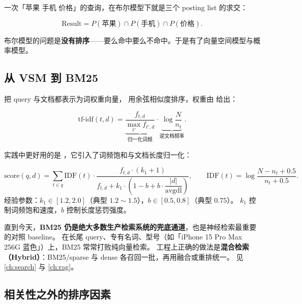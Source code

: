 一次「苹果 手机 价格」的查询，在布尔模型下就是三个 posting list 的求交：

\begin{equation}
\text{Result} = P(\text{苹果}) \cap P(\text{手机}) \cap P(\text{价格}).
\end{equation}

布尔模型的问题是\textbf{没有排序}——要么命中要么不命中。于是有了向量空间模型与概率模型。

\subsection{从 VSM 到 BM25}

 把 query 与文档都表示为词权重向量，
用余弦相似度排序，权重由  给出：

\begin{equation}
\text{tf-idf}(t, d) = \underbrace{\frac{f_{t,d}}{\max_{t'} f_{t',d}}}_{\text{归一化词频}} \cdot
\underbrace{\log \frac{N}{n_t}}_{\text{逆文档频率}} .
\end{equation}

实践中更好用的是 ，它引入了词频饱和与文档长度归一化：

\begin{formulacard}[BM25（Okapi）]
\begin{equation}
\text{score}(q, d) = \sum_{t \in q} \text{IDF}(t) \cdot
\frac{f_{t,d} \cdot (k_1 + 1)}{f_{t,d} + k_1 \cdot \left(1 - b + b \cdot \dfrac{|d|}{\text{avgdl}}\right)} ,
\qquad
\text{IDF}(t) = \log \frac{N - n_t + 0.5}{n_t + 0.5} .
\label{eq:bm25}
\end{equation}
经验参数：$k_1 \in [1.2, 2.0]$（典型 $1.2 \sim 1.5$），$b \in [0.5, 0.8]$（典型 $0.75$）。
$k_1$ 控制词频饱和速度，$b$ 控制长度惩罚强度。
\end{formulacard}

\begin{pitfall}[别把 BM25 当成「古典方法」]
直到今天，\textbf{BM25 仍是绝大多数生产检索系统的兜底通道}，也是神经检索最重要的对照 baseline。
在长尾 query、专有名词、型号（如「iPhone 15 Pro Max 256G 蓝色」）上，BM25 常常打败纯向量检索。
工程上正确的做法是\textbf{混合检索（Hybrid）}：BM25/sparse 与 dense 各召回一批，再用融合或重排统一。
见\cref{ch:search} 与 \cref{ch:rag}。
\end{pitfall}

\subsection{相关性之外的排序因素}

